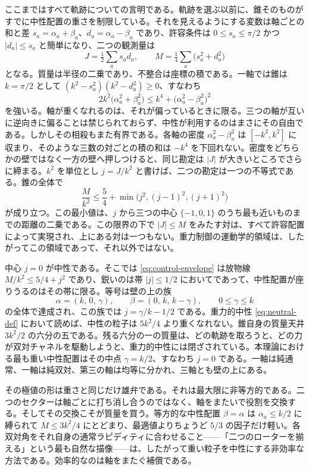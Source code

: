 \documentclass[a4paper]{article}
\begin{document}
ここまではすべて軌跡についての言明である。軌跡を選ぶ以前に、錐そのものがすでに中性配置の重さを制限している。それを見えるようにする変数は軸ごとの和と差 $s_a=\alpha_a+\beta_a$、$d_a=\alpha_a-\beta_a$ であり、許容条件は $0\le s_a\le\pi/2$ かつ $|d_a|\le s_a$ と簡単になり、二つの観測量は
\[
J=\tfrac12\sum_a s_ad_a,\qquad M=\tfrac14\sum_a\bigl(s_a^2+d_a^2\bigr)
\]
となる。質量は半径の二乗であり、不整合は座標の積である。一軸では錐は $k=\pi/2$ として $(k^2-s_a^2)(k^2-d_a^2)\ge 0$、すなわち
\[
2k^2\bigl(\alpha_a^2+\beta_a^2\bigr)\le k^4+\bigl(\alpha_a^2-\beta_a^2\bigr)^2
\]
を強いる。軸が重くなれるのは、それが偏っているときに限る。三つの軸が互いに逆向きに偏ることは禁じられておらず、中性が利用するのはまさにその自由である。しかしその相殺もまた有界である。各軸の密度 $\alpha_a^2-\beta_a^2$ は $[-k^2,k^2]$ に収まり、そのような三数の対ごとの積の和は $-k^4$ を下回れない。密度をどちらかの壁ではなく一方の壁へ押しつけると、同じ勘定は $|J|$ が大きいところでさらに締まる。$k^2$ を単位とし $j=J/k^2$ と書けば、二つの勘定は一つの不等式である。錐の全体で
\begin{equation}
\label{eq:control-envelope}
\frac{M}{k^2}\le \frac54+\min\bigl(j^2,(j-1)^2,(j+1)^2\bigr)
\end{equation}
が成り立つ。この最小値は、$j$ から三つの中心 $\{-1,0,1\}$ のうち最も近いものまでの距離の二乗である。この限界の下で $|J|\le M$ をみたす対は、すべて許容配置によって実現され、上にある対は一つもない。重力制御の運動学的領域は、したがってこの領域であって、それ以外ではない。

中心 $j=0$ が中性である。そこでは \eqref{eq:control-envelope} は放物線 $M/k^2\le 5/4+j^2$ であり、鋭いのは帯 $|j|\le 1/2$ においてであって、中性配置が座りうるのはその帯に限る。等号は壁の上の族
\[
\alpha=(k,\,0,\,\gamma),\qquad\beta=(0,\,k,\,k-\gamma),\qquad 0\le\gamma\le k
\]
の全体で達成され、この族では $j=\gamma/k-1/2$ である。重力的中性 \eqref{eq:neutral-def} において読めば、中性の粒子は $5k^2/4$ より重くなれない。錐自身の質量天井 $3k^2/2$ の六分の五である。残る六分の一の質量は、どの軌跡を取ろうと、どの力が双対チャネルを駆動しようと、重力的中性には閉ざされている。本理論における最も重い中性配置はその中点 $\gamma=k/2$、すなわち $j=0$ である。一軸は純通常、一軸は純双対、第三の軸は均等に分かれ、三軸とも壁の上にある。

その極値の形は重さと同じだけ雄弁である。それは最大限に非等方的である。二つのセクターは軸ごとに打ち消し合うのではなく、軸をまたいで役割を交換する。そしてその交換こそが質量を買う。等方的な中性配置 $\beta=\alpha$ は $\alpha_a\le k/2$ に縛られて $M\le 3k^2/4$ にとどまり、最適値よりちょうど $5/3$ の因子だけ軽い。各双対角をそれ自身の通常ラピディティに合わせること——「二つのローターを揃える」という最も自然な描像——は、したがって重い粒子を中性にする非効率な方法である。効率的なのは軸をまたぐ補償である。
\end{document}
